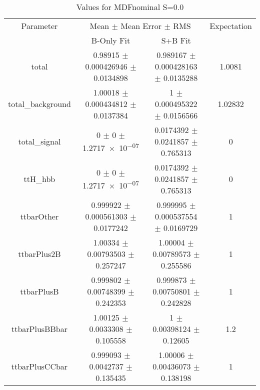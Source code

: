 \begin{table}
\centering
\caption{Values for MDFnominal S=0.0}
\begin{tabular}{cccc}
\toprule
Parameter & \multicolumn{2}{c}{Mean $\pm$ Mean Error $\pm$ RMS} & Expectation\\
 & B-Only Fit & S+B Fit & \\
\midrule
total & \num{0.98915} $\pm$ \num{0.000426946} $\pm$ \num{0.0134898} & \num{0.989167} $\pm$ \num{0.000428163} $\pm$ \num{0.0135288} & \num{1.0081}\\
total\_background & \num{1.00018} $\pm$ \num{0.000434812} $\pm$ \num{0.0137384} & \num{1} $\pm$ \num{0.000495322} $\pm$ \num{0.0156566} & \num{1.02832}\\
total\_signal & \num{0} $\pm$ \num{0} $\pm$ \num{1.2717e-07} & \num{0.0174392} $\pm$ \num{0.0241857} $\pm$ \num{0.765313} & \num{0}\\
ttH\_hbb & \num{0} $\pm$ \num{0} $\pm$ \num{1.2717e-07} & \num{0.0174392} $\pm$ \num{0.0241857} $\pm$ \num{0.765313} & \num{0}\\
ttbarOther & \num{0.999922} $\pm$ \num{0.000561303} $\pm$ \num{0.0177242} & \num{0.999995} $\pm$ \num{0.000537554} $\pm$ \num{0.0169729} & \num{1}\\
ttbarPlus2B & \num{1.00334} $\pm$ \num{0.00793503} $\pm$ \num{0.257247} & \num{1.00004} $\pm$ \num{0.00789573} $\pm$ \num{0.255586} & \num{1}\\
ttbarPlusB & \num{0.999802} $\pm$ \num{0.00748399} $\pm$ \num{0.242353} & \num{0.999873} $\pm$ \num{0.00750801} $\pm$ \num{0.242828} & \num{1}\\
ttbarPlusBBbar & \num{1.00125} $\pm$ \num{0.0033308} $\pm$ \num{0.105558} & \num{1} $\pm$ \num{0.00398124} $\pm$ \num{0.12605} & \num{1.2}\\
ttbarPlusCCbar & \num{0.999093} $\pm$ \num{0.0042737} $\pm$ \num{0.135435} & \num{1.00006} $\pm$ \num{0.00436073} $\pm$ \num{0.138198} & \num{1}\\
\bottomrule
\end{tabular}
\end{table}